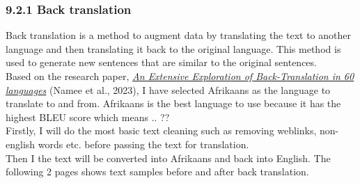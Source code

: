 \subsubsection*{9.2.1 Back translation}
Back translation is a method to augment data by translating the text to another language and then translating it back to the original language. This method is used to generate new sentences that are similar to the original sentences. \\
Based on the research paper, \href{https://aclanthology.org/2023.findings-acl.518.pdf}{\textit{An Extensive Exploration of Back-Translation in 60 languages}} (Namee et al., 2023), I have selected Afrikaans as the language to translate to and from. Afrikaans is the best language to use because it has the highest BLEU score which means .. ?? \\
\newline
Firstly, I will do the most basic text cleaning such as removing weblinks, non-english words etc. before passing the text for translation. \\
Then I the text will be converted into Afrikaans and back into English. The following 2 pages shows text samples before and after back translation. \\

